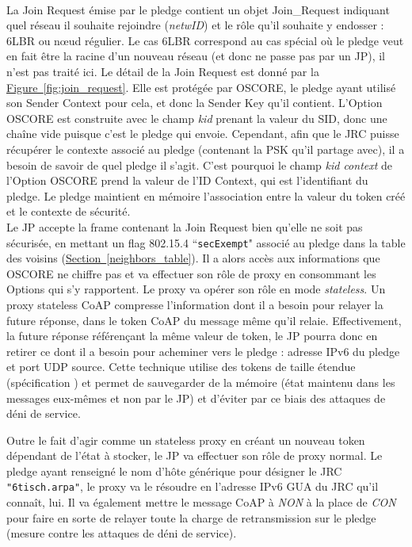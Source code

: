\documentclass[]{report}
\newcommand{\minit}[1]{\noindent{\small\textbf{ \underline{#1}}}~\\}
\newcommand{\wordlink}[2]{\hyperref[#2]{#1~\ref{#2}}}
\begin{document}
\vspace{0.6cm}

\minit{pledge $\rightarrow$ JP (Join Request)}

La Join Request émise par le pledge contient un objet Join\_Request indiquant quel réseau il souhaite rejoindre (\textit{netwID}) et le rôle qu'il souhaite y endosser : 6LBR ou nœud régulier. Le cas 6LBR correspond au cas spécial où le pledge veut en fait être la racine d'un nouveau réseau (et donc ne passe pas par un JP), il n'est pas traité ici. Le détail de la Join Request est donné par la \wordlink{Figure}{fig:join_request}. Elle est protégée par OSCORE, le pledge ayant utilisé son Sender Context pour cela, et donc la Sender Key qu'il contient. L'Option OSCORE est construite avec le champ \textit{kid} prenant la valeur du SID, donc une chaîne vide puisque c'est le pledge qui envoie. Cependant, afin que le JRC puisse récupérer le contexte associé au pledge (contenant la PSK qu'il partage avec), il a besoin de savoir de quel pledge il s'agit. C'est pourquoi le champ \textit{kid context} de l'Option OSCORE prend la valeur de l'ID Context, qui est l'identifiant du pledge. Le pledge maintient en mémoire l'association entre la valeur du token créé et le contexte de sécurité.\\

 Le JP accepte la frame contenant la Join Request bien qu'elle ne soit pas sécurisée, en mettant un flag 802.15.4 ``\texttt{secExempt}" associé au pledge dans la table des voisins (\wordlink{Section}{neighbors_table}). Il a alors accès aux informations que OSCORE ne chiffre pas et va effectuer son rôle de proxy en consommant les Options qui s'y rapportent. Le proxy va opérer son rôle en mode \textit{stateless}. Un proxy stateless CoAP \cite{ietf-core-stateless-05} compresse l'information dont il a besoin pour relayer la future réponse, dans le token CoAP du message même qu'il relaie. Effectivement, la future réponse référençant la même valeur de token, le JP pourra donc en retirer ce dont il a besoin pour acheminer vers le pledge : adresse IPv6 du pledge et port UDP source. Cette technique utilise des tokens de taille étendue (spécification \cite{ietf-core-stateless-05}) et permet de sauvegarder de la mémoire (état maintenu dans les messages eux-mêmes et non par le JP) et d'éviter par ce biais des attaques de déni de service.\\
 
\newpage 
 
 Outre le fait d'agir comme un stateless proxy en créant un nouveau token dépendant de l'état à stocker, le JP va effectuer son rôle de proxy normal. Le pledge ayant renseigné le nom d'hôte générique pour désigner le JRC \texttt{"6tisch.arpa"}, le proxy va le résoudre en l'adresse IPv6 GUA du JRC qu'il connaît, lui. Il va également mettre le message CoAP à \textit{NON} à la place de \textit{CON} pour faire en sorte de relayer toute la charge de retransmission sur le pledge (mesure contre les attaques de déni de service).\\
\end{document}

